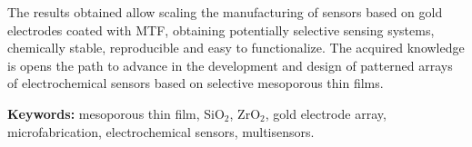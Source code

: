 The results obtained allow scaling the manufacturing of sensors based on gold electrodes coated with MTF, obtaining potentially selective sensing systems, chemically stable, reproducible and easy to functionalize. The acquired knowledge is opens the path to advance in the development and design of patterned arrays of electrochemical sensors based on selective mesoporous thin films.

\vspace*{\fill}

\vfill

\noindent\textbf{Keywords:} mesoporous thin film, SiO$_2$, ZrO$_2$, gold electrode array, microfabrication, electrochemical sensors, multisensors.

\cleardoublepage

